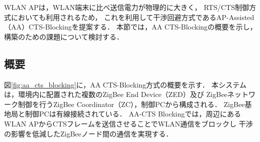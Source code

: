 \documentclass[technicalreport]{ieicej}
\begin{document}
WLAN APは，WLAN端末に比べ送信電力が物理的に大きく，
RTS/CTS制御方式においても利用されるため，
これを利用して干渉回避方式であるAP-Assisted（AA）CTS-Blockingを提案する．
本節では，AA CTS-Blockingの概要を示し，
構築のための課題について検討する．


\subsection{概要}
\label{ssec:outline}

図\ref{fig:aa_cts_blocking}に，AA CTS-Blocking方式の概要を示す．
本システムは，環境内に配置された複数のZigBee End Device（ZED）及び
ZigBeeネットワーク制御を行うZigBee Coordinator（ZC），制御PCから構成される．
ZigBee基地局と制御PCは有線接続されている．
AA-CTS Blockingでは，周辺にあるWLAN APからCTSフレームを送信させることでWLAN通信をブロックし
干渉の影響を低減したZigBeeノード間の通信を実現する．

\end{document}
